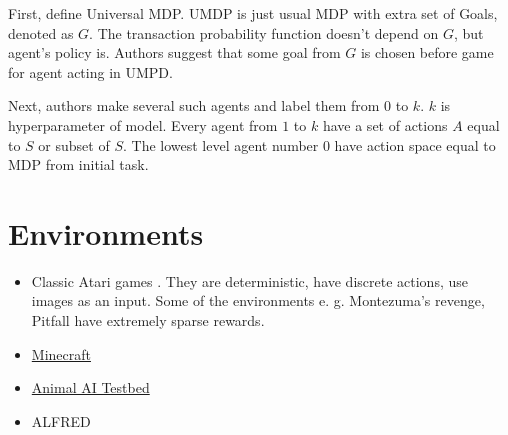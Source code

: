 \documentclass{article}
\begin{document}
First, define Universal MDP. UMDP is just usual MDP with extra set of Goals, denoted as $G$. The transaction probability function doesn't depend on $G$, but agent's policy is. Authors suggest that some goal from $G$ is chosen before game for agent acting in UMPD.

Next, authors make several such agents and label them from $0$ to $k$. $k$ is hyperparameter of model. Every agent from $1$ to $k$ have a set of actions $A$ equal to $S$ or subset of $S$. The lowest level agent number $0$ have action space equal to MDP from initial task.

\section{Environments}

\begin{itemize}
  \item Classic Atari games \citep{Mnih2013PlayingAW}. They are deterministic, have discrete actions, use images as an input. Some of the environments e. g. Montezuma's revenge, Pitfall have extremely sparse rewards.
  \item \href{https://minerl.io/competition/}{Minecraft}
  \item \href{http://animalaiolympics.com/AAI/}{Animal AI Testbed} 
  \item ALFRED~\citep{ALFRED20}
\end{itemize}



\end{document}
